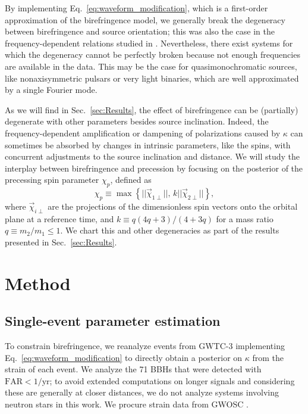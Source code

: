 \documentclass[aps,prd,twocolumn,superscriptaddress,preprintnumbers,floatfix,nofootinbib]{revtex4-2}
\begin{document}
By implementing Eq.~\eqref{eq:waveform_modification}, which is a first-order approximation of the birefringence model, we generally break the degeneracy between birefringence and source orientation; this was also the case in the frequency-dependent relations studied in \cite{Yamada_2020,Wang_2021}.
Nevertheless, there exist systems for which the degeneracy cannot be perfectly broken because not enough frequencies are available in the data.
This may be the case for quasimonochromatic sources, like nonaxisymmetric pulsars or very light binaries, which are well approximated by a single Fourier mode.

As we will find in Sec.~\ref{sec:Results}, the effect of birefringence can be (partially) degenerate with other parameters besides source inclination.
Indeed, the frequency-dependent amplification or dampening of polarizations caused by $\kappa$ can sometimes be absorbed by changes in intrinsic parameters, like the spins, with concurrent adjustments to the source inclination and distance.
We will study the interplay between birefringence and precession by focusing on the posterior of the precessing spin parameter $\chi_p$, defined as \cite{Schmidt:2014iyl}
\begin{equation}
\chi_p \equiv \max\left\{ ||\vec{\chi}_{1\perp}||,\, k ||\vec{\chi}_{2\perp}||\right\} ,
\end{equation}
where $\vec{\chi}_{i\perp}$ are the projections of the dimensionless spin vectors onto the orbital plane at a reference time, and $k \equiv q\left(4 q +3\right) / \left(4 + 3q\right)$ for a mass ratio $q \equiv m_2/m_1 \leq 1$.
We chart this and other degeneracies as part of the results presented in Sec.~\ref{sec:Results}.


\section{Method}
\label{sec:Method}

\subsection{Single-event parameter estimation}

To constrain birefringence, we reanalyze events from GWTC-3 \citep{GWTC-2.1, GWTC-3} implementing Eq.~\eqref{eq:waveform_modification} to directly obtain a posterior on $\kappa$ from the strain of each event.
We analyze the 71 \acp{BBH} that were detected with $\mathrm{FAR} < 1/\mathrm{yr}$; to avoid extended computations on longer signals and considering these are generally at closer distances, we do not analyze systems involving neutron stars in this work.
We procure strain data from \ac{GWOSC} \citep{GWOSC}.
\end{document}
